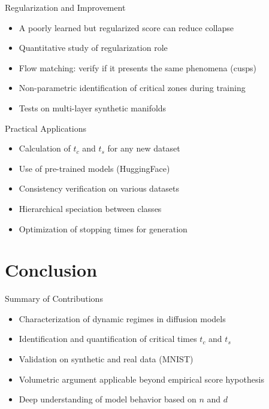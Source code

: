 \documentclass[aspectratio=169]{beamer}
\begin{document}
\begin{frame}{Regularization and Improvement}
    \begin{itemize}
        \item A poorly learned but regularized score can reduce collapse
        \item Quantitative study of regularization role
        \item Flow matching: verify if it presents the same phenomena (cusps)
        \item Non-parametric identification of critical zones during training
        \item Tests on multi-layer synthetic manifolds
    \end{itemize}
\end{frame}

\begin{frame}{Practical Applications}
    \begin{itemize}
        \item Calculation of $t_c$ and $t_s$ for any new dataset
        \item Use of pre-trained models (HuggingFace)
        \item Consistency verification on various datasets
        \item Hierarchical speciation between classes
        \item Optimization of stopping times for generation
    \end{itemize}
\end{frame}

\section{Conclusion}

\begin{frame}{Summary of Contributions}
    \begin{itemize}
        \item Characterization of dynamic regimes in diffusion models
        \item Identification and quantification of critical times $t_c$ and $t_s$
        \item Validation on synthetic and real data (MNIST)
        \item Volumetric argument applicable beyond empirical score hypothesis
        \item Deep understanding of model behavior based on $n$ and $d$
    \end{itemize}
\end{frame}
\end{document}
